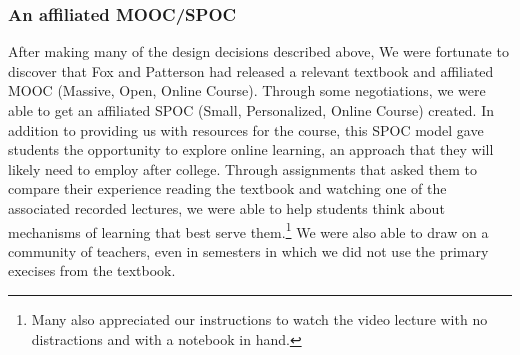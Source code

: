 \subsubsection{An affiliated MOOC/SPOC}

After making many of the design decisions described above, We were
fortunate to discover that Fox and Patterson had released a relevant
textbook \cite{saasbook} and affiliated MOOC (Massive, Open, Online
Course).  Through some negotiations, we were able to get an affiliated
SPOC (Small, Personalized, Online Course) created.  In addition to
providing us with resources for the course, this SPOC model gave
students the opportunity to explore online learning, an approach
that they will likely need to employ after college.  Through
assignments that asked them to compare their experience reading the
textbook and watching one of the associated recorded lectures, we
were able to help students think about mechanisms of learning that
best serve them.\footnote{Many also appreciated our instructions
to watch the video lecture with no distractions and with a notebook
in hand.}  We were also able to draw on a community of teachers,
even in semesters in which we did not use the primary execises from
the textbook.

